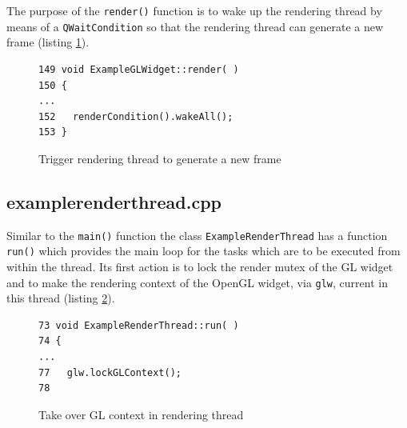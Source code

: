 \documentclass[jou,noapacite]{apa}
\begin{document}
The purpose of the \lstinline|render()| function is to wake up the rendering
thread by means of a \lstinline|QWaitCondition| so that the rendering thread can
generate a new frame (listing \ref{lst:render}).
%
\begin{figure}[h]
\begin{lstlisting}[basicstyle=\scriptsize]
149 void ExampleGLWidget::render( )
150 {
...
152   renderCondition().wakeAll();
153 }
\end{lstlisting}
\caption{Trigger rendering thread to generate a new frame}
\label{lst:render}
\end{figure}

\subsection{examplerenderthread.cpp}

Similar to the \lstinline|main()| function the
class \lstinline|ExampleRenderThread| has a function \lstinline|run()| which
provides the main loop for the tasks which are to be executed from within the
thread.
%
Its first action is to lock the render mutex of the GL widget and to make the
rendering context of the OpenGL widget, via \lstinline|glw|, current in this
thread (listing \ref{lst:run}).
%
\begin{figure}[h]
\begin{lstlisting}[basicstyle=\scriptsize]
73 void ExampleRenderThread::run( )
74 {
...
77   glw.lockGLContext();
78
\end{lstlisting}
\caption{Take over GL context in rendering thread}
\label{lst:run}
\end{figure}
%
\end{document}
